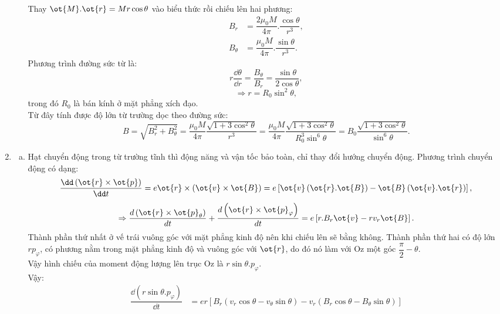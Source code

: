 \begin{loigiai}
\begin{enumerate}[1)]
\begin{enumerate}[a)]
            Thay $\ot{M}.\ot{r}=Mr\cos \theta $ vào biểu thức rồi chiếu lên hai phương:
            \[\begin{aligned}
                {{B}_{r}} &= \dfrac{2{{\mu }_{0}}M}{4\pi }.\dfrac{\cos\theta }{{{r}^{3}}},\\
                {{B}_{\theta }} &= \dfrac{{{\mu }_{0}}M}{4\pi }.\dfrac{\sin \theta }{{{r}^{3}}}.
            \end{aligned}\]
            Phương trình đường sức từ là:
            \[r\dfrac{\dd \theta }{\dd r}=\dfrac{{{B}_{\theta }}}{{{B}_{r}}}=\dfrac{\sin\theta }{2\cos\theta},\]
            \[\Rightarrow r={{R}_{0}}{{\sin }^{2}}\theta,\] trong đó ${{R}_{0}}$ là bán kính ở mặt phẳng xích đạo.
            \\Từ đây tính được độ lớn từ trường dọc theo đường sức:
            \[B=\sqrt{B_{r}^{2}+B_{\theta }^{2}}=\dfrac{{{\mu }_{0}}M}{4\pi }\dfrac{\sqrt{1+3{{\cos }^{2}}\theta }}{{{r}^{3}}}=\dfrac{{{\mu }_{0}}M}{4\pi }\dfrac{\sqrt{1+3{{\cos }^{2}}\theta }}{R_{0}^{3}{{\sin }^{6}}\theta }={{B}_{0}}\dfrac{\sqrt{1+3{{\cos }^{2}}\theta }}{{{\sin }^{6}}\theta}.\]
        \end{enumerate}
        \item \begin{enumerate}[a)]
            \item Hạt chuyển động trong từ trường tĩnh thì động năng và vận tốc bảo toàn, chỉ thay đổi hướng chuyển động. Phương trình chuyển động có dạng:
            \[\dfrac{\dd\left( \ot{r}\times \ot{p} \right)}{\dd t}=e\ot{r}\times \left( \ot{v}\times \ot{B} \right)=e\left[ \ot{v}\left( \ot{r}.\ot{B} \right) - \ot{B}\left( \ot{v}.\ot{r} \right) \right],\]
            \[\Rightarrow \dfrac{d\left( \ot{r}\times {{{\ot{p}}}_{\theta }} \right)}{dt}+\dfrac{d\left( \ot{r}\times {{{\ot{p}}}_{\varphi }} \right)}{dt}=e\left[ r.{{B}_{r}}\ot{v}-r{{v}_{r}}\ot{B} \right].\]
            Thành phần thứ nhất ở vế trái vuông góc với mặt phẳng kinh độ nên khi chiếu lên sẽ bằng không. Thành phần thứ hai có độ lớn $r{{p}_{\varphi }}$, có phương nằm trong mặt phẳng kinh độ và vuông góc với $\ot{r}$, do đó nó làm với Oz một góc $\dfrac{\pi }{2}-\theta$. \\Vậy hình chiếu của moment động lượng lên trục Oz là $r\sin \theta .{{p}_{\varphi }}$.
            \\Vậy:\[\begin{aligned}
                \dfrac{\dd\left( r\sin \theta .{{p}_{\varphi }} \right)}{\dd t}&=er\left[ {{B}_{r}}\left( {{v}_{r}}\cos \theta -{{v}_{\theta }}\sin \theta  \right)-{{v}_{r}}\left( {{B}_{r}}\cos \theta -{{B}_{\theta }}\sin \theta  \right) \right]\\

\end{aligned}\]
\end{enumerate}
\end{enumerate}
\end{loigiai}
